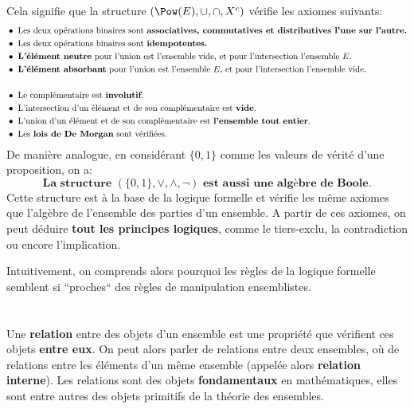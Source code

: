 Cela signifie que la structure \((\Pow(E), \cup, \cap, X^c)\) vérifie les axiomes suivants:
\begin{align*}
    &\bullet \text{ Les deux opérations binaires sont \textbf{associatives, commutatives et distributives l'une sur l'autre.}}\\
    &\bullet \text{ Les deux opérations binaires sont \textbf{idempotentes.}}\\
    &\bullet \text{ \textbf{L'élément neutre} pour l'union est l'ensemble vide, et pour l'intersection l'ensemble \(E\).}\\
    &\bullet \text{ \textbf{L'élément absorbant} pour l'union est l'ensemble \(E\), et pour l'intersection l'ensemble vide.}\\
    &\\
    &\bullet \text{ Le complémentaire est \textbf{involutif}.}\\
    &\bullet \text{ L'intersection d'un élément et de son complémentaire est \textbf{vide}.}\\
    &\bullet \text{ L'union d'un élément et de son complémentaire est \textbf{l'ensemble tout entier}.}\\
    &\bullet \text{ Les \textbf{lois de De Morgan} sont vérifiées.}\\
\end{align*}
De manière analogue, en considérant \(\{0, 1\}\) comme les valeurs de vérité d'une proposition, on a:
\[
    \boxed{
        \textbf{La structure } (\{0, 1\}, \lor, \land, \lnot) \textbf{ est aussi une algèbre de Boole.}
    }
\]
Cette structure est à la base de la logique formelle et vérifie les même axiomes que l'algèbre de l'ensemble des parties d'un ensemble.\+
A partir de ces axiomes, on peut déduire \textbf{tout les principes logiques}, comme le tiers-exclu, la contradiction ou encore l'implication.\<

Intuitivement, on comprends alors pourquoi les règles de la logique formelle semblent si ``proches`` des règles de manipulation ensemblistes. 


\chapter*{}
Une \textbf{relation} entre des objets d'un ensemble est une propriété que vérifient ces objets \textbf{entre eux}.\+
On peut alors parler de relations entre deux ensembles, où de relations entre les éléments d'un même ensemble (appelée alors \textbf{relation interne}).\+
Les relations sont des objets \textbf{fondamentaux} en mathématiques, elles sont entre autres des objets primitifs de la théorie des ensembles.\<


